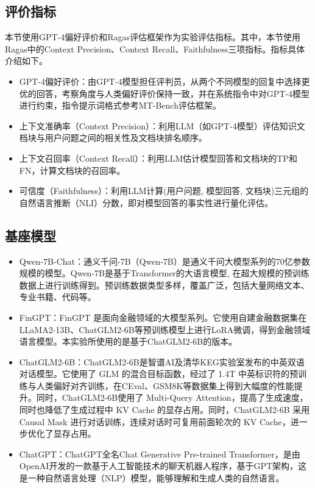 \subsection{评价指标}

本节使用GPT-4偏好评价和Ragas\cite{DBLP:conf/eacl/ESJAS24}评估框架作为实验评估指标。其中，本节使用Ragas中的Context Precision、Context Recall、Faithfulness三项指标。指标具体介绍如下。

\begin{itemize}[topsep = 0 pt, itemsep= 0 pt, parsep=0pt, partopsep=0pt, leftmargin=36pt, itemindent=0pt, labelsep=6pt, listparindent=24pt]
	\item GPT-4偏好评价：由GPT-4\cite{DBLP:journals/corr/abs-2303-08774}模型担任评判员，从两个不同模型的回复中选择更优的回答，考察角度与人类偏好评价保持一致，并在系统指令中对GPT-4模型进行约束，指令提示词格式参考MT-Bench\cite{zheng2023judging}评估框架。
	\item 上下文准确率（Context Precision）：利用LLM（如GPT-4模型）评估知识文档块与用户问题之间的相关性及文档块排名顺序。
	\item 上下文召回率（Context Recall）：利用LLM估计模型回答和文档块的TP和FN，计算文档块的召回率。
	\item 可信度（Faithfulness）：利用LLM计算(用户问题, 模型回答, 文档块)三元组的自然语言推断（NLI）分数，即对模型回答的事实性进行量化评估。
\end{itemize}

\subsection{基座模型}

\begin{itemize}[topsep = 0 pt, itemsep= 0 pt, parsep=0pt, partopsep=0pt, leftmargin=36pt, itemindent=0pt, labelsep=6pt, listparindent=24pt]
	\item Qwen-7B-Chat\cite{DBLP:journals/corr/abs-2309-16609}：通义千问-7B（Qwen-7B）是通义千问大模型系列的70亿参数规模的模型。Qwen-7B是基于Transformer的大语言模型, 在超大规模的预训练数据上进行训练得到。预训练数据类型多样，覆盖广泛，包括大量网络文本、专业书籍、代码等。
	\item FinGPT\cite{yang2023fingpt}：FinGPT 是面向金融领域的大模型系列。它使用自建金融数据集在LLaMA2-13B\cite{DBLP:journals/corr/abs-2307-09288}、ChatGLM2-6B等预训练模型上进行LoRA微调，得到金融领域语言模型。本实验所使用的是基于ChatGLM2-6B的版本。
	\item ChatGLM2-6B\cite{DBLP:conf/iclr/ZengLDWL0YXZXTM23}：ChatGLM2-6B是智谱AI及清华KEG实验室发布的中英双语对话模型。它使用了 GLM 的混合目标函数，经过了 1.4T 中英标识符的预训练与人类偏好对齐训练，在CEval、GSM8K等数据集上得到大幅度的性能提升。同时，ChatGLM2-6B使用了 Multi-Query Attention，提高了生成速度，同时也降低了生成过程中 KV Cache 的显存占用。同时，ChatGLM2-6B 采用 Causal Mask 进行对话训练，连续对话时可复用前面轮次的 KV Cache，进一步优化了显存占用。
	\item ChatGPT\cite{DBLP:conf/nips/Ouyang0JAWMZASR22}：ChatGPT全名Chat Generative Pre-trained Transformer，是由OpenAI开发的一款基于人工智能技术的聊天机器人程序，基于GPT\cite{radford2018improving}架构，这是一种自然语言处理（NLP）模型，能够理解和生成人类的自然语言。
\end{itemize}

